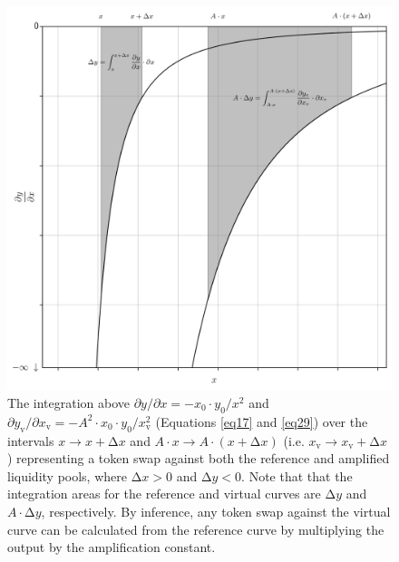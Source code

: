 \documentclass{article}
\begin{document}
\begin{figure}[ht]
    \centering
    \includegraphics[width=\textwidth]{fig15.png}
    \captionsetup{
        justification=raggedright,
        singlelinecheck=false,
        font=small,
        labelfont=bf,
        labelsep=quad,
        format=plain
    }
    \caption{The integration above $\partial y / \partial x = - x_{0} \cdot y_{0} / x^{2}$ and $\partial y_{\text{v}} / \partial x_{\text{v}} = - A^{2} \cdot x_{0} \cdot y_{0} / x_{\text{v}}^{2}$ (Equations \ref{eq17} and \ref{eq29}) over the intervals $x \rightarrow x + \mathrm{\Delta}x$ and $A \cdot x \rightarrow A \cdot \left( x + \mathrm{\Delta}x\right)$ (i.e. $x_{\text{v}} \rightarrow x_{\text{v}} + \mathrm{\Delta}x$) representing a token swap against both the reference and amplified liquidity pools, where $\mathrm{\Delta}x > 0$ and $\mathrm{\Delta}y < 0$. Note that that the integration areas for the reference and virtual curves are $\mathrm{\Delta}y$ and $A \cdot \mathrm{\Delta}y$, respectively. By inference, any token swap against the virtual curve can be calculated from the reference curve by multiplying the output by the amplification constant.}
    \label{fig15}
\end{figure}
\end{document}

